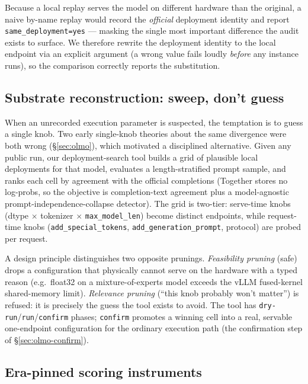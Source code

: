 Because a local replay serves the model on different hardware than the original,
a naive by-name replay would record the \emph{official} deployment identity and
report \texttt{same\_deployment=yes} --- masking the single most important
difference the audit exists to surface. We therefore rewrite the deployment
identity to the local endpoint via an explicit argument (a wrong value fails
loudly \emph{before} any instance runs), so the comparison correctly reports the
substitution.

\subsection{Substrate reconstruction: sweep, don't guess}
\label{sec:deploymatch}

When an unrecorded execution parameter is suspected, the temptation is to guess a
single knob. Two early single-knob theories about the same divergence were both
wrong (\S\ref{sec:olmo}), which motivated a disciplined alternative. Given any
public run, our deployment-search tool builds a grid of plausible local
deployments for that model, evaluates a length-stratified prompt sample, and ranks
each cell by agreement with the official completions (Together stores no
log-probs, so the objective is completion-text agreement plus a model-agnostic
prompt-independence-collapse detector). The grid is two-tier: serve-time knobs
(dtype $\times$ tokenizer $\times$ \texttt{max\_model\_len}) become distinct
endpoints, while request-time knobs (\texttt{add\_special\_tokens},
\texttt{add\_generation\_prompt}, protocol) are probed per request.

A design principle distinguishes two opposite prunings. \emph{Feasibility
pruning} (safe) drops a configuration that physically cannot serve on the hardware
with a typed reason (e.g.\ float32 on a mixture-of-experts model exceeds the vLLM
fused-kernel shared-memory limit). \emph{Relevance pruning} (``this knob probably
won't matter'') is refused: it is precisely the guess the tool exists to avoid.
The tool has \texttt{dry-run}/\texttt{run}/\texttt{confirm} phases; \texttt{confirm}
promotes a winning cell into a real, servable one-endpoint configuration for the
ordinary execution path (the confirmation step of \S\ref{sec:olmo-confirm}).

\subsection{Era-pinned scoring instruments}
\label{sec:eras}

